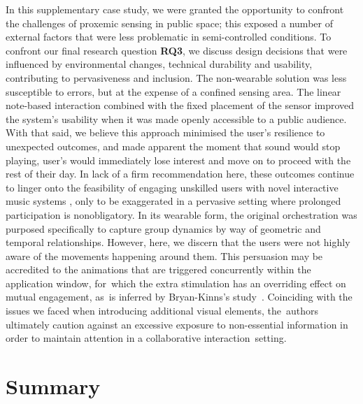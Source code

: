In this supplementary case study, we were granted the opportunity to confront the challenges of proxemic sensing in public space; this exposed a number of external factors that were less problematic in semi-controlled conditions. To confront our final research question \textbf{RQ3}, we discuss design decisions that were influenced by environmental changes, technical durability and usability, contributing to pervasiveness and inclusion. The non-wearable solution was less susceptible to errors, but at the expense of a confined sensing area. The linear note-based interaction combined with the fixed placement of the sensor improved the system's usability when it was made openly accessible to a public audience. With that said, we believe this approach minimised the user's resilience to unexpected outcomes, and made apparent the moment that sound would stop playing, user's would immediately lose interest and move on to proceed with the rest of their day. In lack of a firm recommendation here, these outcomes continue to linger onto the feasibility of engaging unskilled users with novel interactive music systems \citep{holland_musical_2019}, only to be exaggerated in a pervasive setting where prolonged participation is nonobligatory. In its wearable form, the original orchestration was purposed specifically to capture group dynamics by way of geometric and temporal relationships. However, here, we discern that the users were not highly aware of the movements happening around them. This persuasion may be accredited to the animations that are triggered concurrently within the application window, for~which the extra stimulation has an overriding effect on mutual engagement, as~is inferred by  Bryan-Kinns's %
study~\cite{bryan-kinns_mutual_2013}. Coinciding with the issues we faced when introducing additional visual elements, the~authors ultimately caution against an excessive exposure to non-essential information in order to maintain attention in a collaborative interaction~setting.


\section{Summary}

